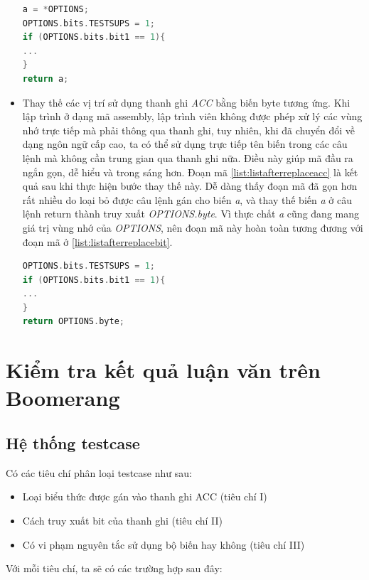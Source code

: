 \begin{itemize}
\begin{lstlisting}[caption={Mã đầu ra sau khi thực hiện bước thay thế truy xuất đặc biệt đến bit của thanh ghi ACC},label={list:listafterreplacebit}, language = c]
a = *OPTIONS;
OPTIONS.bits.TESTSUPS = 1;
if (OPTIONS.bits.bit1 == 1){
...
}
return a;
\end{lstlisting}
\item Thay thế các vị trí sử dụng thanh ghi \textit{ACC} bằng biến byte tương ứng. Khi lập trình ở dạng mã assembly, lập trình viên không được phép xử lý các vùng nhớ trực tiếp mà phải thông qua thanh ghi, tuy nhiên, khi đã chuyển đổi về dạng ngôn ngữ cấp cao, ta có thể sử dụng trực tiếp tên biến trong các câu lệnh mà không cần trung gian qua thanh ghi nữa. Điều này giúp mã đầu ra ngắn gọn, dễ hiểu và trong sáng hơn. Đoạn mã \ref{list:listafterreplaceacc} là kết quả sau khi thực hiện bước thay thế này. Dễ dàng thấy đoạn mã đã gọn hơn rất nhiều do loại bỏ được câu lệnh gán cho biến \textit{a}, và thay thế biến \textit{a} ở câu lệnh return thành truy xuất \textit{OPTIONS.byte}. Vì thực chất \textit{a} cũng đang mang giá trị vùng nhớ của \textit{OPTIONS}, nên đoạn mã này hoàn toàn tương đương với đoạn mã ở \ref{list:listafterreplacebit}.

\begin{lstlisting}[caption={Mã đầu ra sau khi thực hiện bước thay thế thanh ghi ACC},label={list:listafterreplaceacc}, language = c]
OPTIONS.bits.TESTSUPS = 1;
if (OPTIONS.bits.bit1 == 1){
...
}
return OPTIONS.byte;
\end{lstlisting}
\end{itemize}


\section{Kiểm tra kết quả luận văn trên Boomerang}

\subsection{Hệ thống testcase}
Có các tiêu chí phân loại testcase như sau:
\begin{itemize}
	\item Loại biểu thức được gán vào thanh ghi ACC (tiêu chí I)
	\item Cách truy xuất bit của thanh ghi (tiêu chí II)
	\item Có vi phạm nguyên tắc sử dụng bộ biến hay không (tiêu chí III)
\end{itemize}
Với mỗi tiêu chí, ta sẽ có các trường hợp sau đây:

